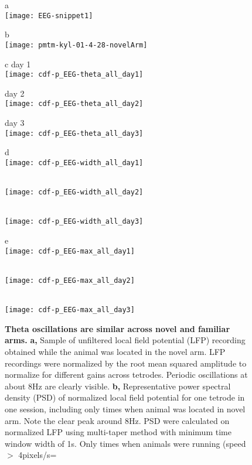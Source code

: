\documentclass[preprint,rmp,preprintnumbers,floatfix]{revtex4}
\begin{document}
\newpage %
\begin{figure*}[htbp]
    \centering
    \parbox[t]{1.5in}{
        \parbox[t]{1.5in}{ {\sf a}  \hfill \mbox{} \\
            \texttt{[image: EEG-snippet1]}
        }
        \parbox[t]{1.5in}{ {\sf b}  \hfill \mbox{} \\
            \texttt{[image: pmtm-kyl-01-4-28-novelArm]}
        }
    }
    \parbox[t]{4.6in}{
        \parbox[t]{1.5in} { {\sf c} \hfill day 1\hfill\mbox{} \\
            \texttt{[image: cdf-p\_EEG-theta\_all\_day1]}
        }
        \parbox[t]{1.5in} { \hfill day 2\hfill\mbox{} \\
            \texttt{[image: cdf-p\_EEG-theta\_all\_day2]}
        }
        \parbox[t]{1.5in} { \hfill day 3\hfill\mbox{} \\
            \texttt{[image: cdf-p\_EEG-theta\_all\_day3]}
        }
        \parbox[t]{1.5in} { {\sf d}  \hfill \mbox{} \\
            \texttt{[image: cdf-p\_EEG-width\_all\_day1]}
        }
        \parbox[t]{1.5in} { \mbox{} \\
            \texttt{[image: cdf-p\_EEG-width\_all\_day2]}
        }
        \parbox[t]{1.5in} { \mbox{} \\
            \texttt{[image: cdf-p\_EEG-width\_all\_day3]}
        }
        \parbox[t]{1.5in} { {\sf e}  \hfill \mbox{} \\
            \texttt{[image: cdf-p\_EEG-max\_all\_day1]}
        }
        \parbox[t]{1.5in} { \mbox{} \\
            \texttt{[image: cdf-p\_EEG-max\_all\_day2]}
        }
        \parbox[t]{1.5in} { \mbox{} \\
            \texttt{[image: cdf-p\_EEG-max\_all\_day3]}
        }
    }
    \caption{{\bf Theta oscillations are similar across novel and familiar arms.   }
    {\bf a,} Sample of unfiltered local field potential (LFP) recording obtained
    while the animal was located in the novel arm. LFP recordings were
    normalized by the root mean squared amplitude to normalize for different
    gains across
    tetrodes. Periodic oscillations at about 8Hz are clearly visible. 
    {\bf b,} Representative power spectral density (PSD) of normalized local
    field potential for one tetrode in one session, including only times when
    animal was located in novel arm. Note the clear peak around 8Hz. PSD were
    calculated on normalized LFP using multi-taper method with minimum time
    window width of 1s. Only times when animals were running (speed $>$ 4pixels/s=
}
\end{figure*}
\end{document}
